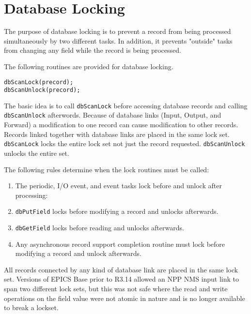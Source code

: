 \section{Database Locking}

The purpose of database locking is to prevent a record from being processed simultaneously by two different tasks. In 
addition, it prevents "outside" tasks from changing any field while the record is being processed.

The following routines are provided for database locking.

\begin{verbatim}dbScanLock(precord);
dbScanUnlock(precord);
\end{verbatim}
The basic idea is to call \verb|dbScanLock| before accessing database records and calling \verb|dbScanUnlock| afterwords. 
Because of database links (Input, Output, and Forward) a modification to one record can cause modification to other 
records. Records linked together with database links are placed in the same lock set. \verb|dbScanLock| locks the entire lock 
set not just the record requested. \verb|dbScanUnlock| unlocks the entire set.

The following rules determine when the lock routines must be called:

\begin{enumerate}\item The periodic, I/O event, and event tasks lock before and unlock after processing:

\item \verb|dbPutField| locks before modifying a record and unlocks afterwards.

\item \verb|dbGetField| locks before reading and unlocks afterwards.

\item Any asynchronous record support completion routine must lock before modifying a record and unlock afterwards.

\end{enumerate}
All records connected by any kind of database link are placed in the same lock set. Versions of EPICS Base prior to R3.14 
allowed an NPP NMS input link to span two different lock sets, but this was not safe where the read and write operations 
on the field value were not atomic in nature and is no longer available to break a lockset.

